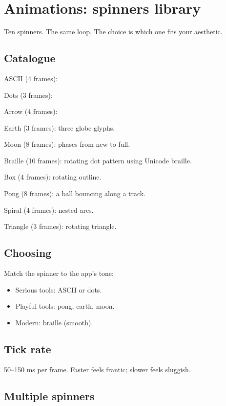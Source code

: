 \chapter{Animations: spinners library}
\label{ch:spinners}

\begin{aside}
Ten spinners. The same loop. The choice is which one fits
your aesthetic.
\end{aside}

\section{Catalogue}

ASCII (4 frames): \code{| / - \textbackslash}

Dots (3 frames): 

Arrow (4 frames): 

Earth (3 frames): three globe glyphs.

Moon (8 frames): phases from new to full.

Braille (10 frames): rotating dot pattern using Unicode
braille.

Box (4 frames): rotating outline.

Pong (8 frames): a ball bouncing along a track.

Spiral (4 frames): nested arcs.

Triangle (3 frames): rotating triangle.

\section{Choosing}

Match the spinner to the app's tone:

\begin{itemize}[leftmargin=*]
  \item Serious tools: ASCII or dots.
  \item Playful tools: pong, earth, moon.
  \item Modern: braille (smooth).
\end{itemize}

\section{Tick rate}

50--150 ms per frame. Faster feels frantic; slower feels
sluggish.

\section{Multiple spinners}

